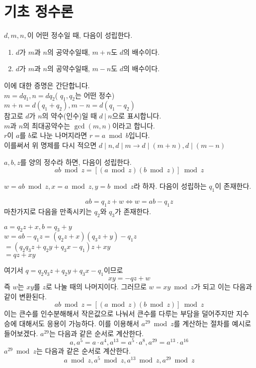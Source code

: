 \section{기초 정수론}

\begin{justbox}
$d,m,n,$이 어떤 정수일 때, 다음이 성립한다.
\begin{enumerate}
    \item $d$가 $m$과 $n$의 공약수일때, $m+n$도 $d$의 배수이다.
    \item $d$가 $m$과 $n$의 공약수일때, $m-n$도 $d$의 배수이다.     
\end{enumerate}
\end{justbox}
이에 대한 증명은 간단합니다. \\
$m=dq_1 , n = dq_2$( $q_1,q_2$는 어떤 정수)\\
$m+n = d(q_1 + q_2) , m-n=d(q_1-q_2)$ \\
참고로 $d$가 $n$의 약수(인수)일 때 $d\: |\: n$으로 표시합니다.\\
$m$과 $n$의 최대공약수는 $\gcd(m,n)$이라고 합니다.\\
$r$이 $a$를 $b$로 나눈 나머지라면  $r=a\bmod b$입니다. \\
이를써서 위 명제를 다시 적으면 $d\mid n , d\mid m  \longrightarrow d \mid (m+n), d\mid (m-n)$



\begin{justbox}
$a,b,z$를 양의 정수라 하면, 다음이 성립한다.
\[ ab\bmod z= [(a\bmod z)(b \bmod z)]\bmod z \]
\end{justbox}

$w = ab\bmod z, x =a \bmod z, y=b\bmod z$라 하자.
다음이 성립하는 $q_1$이 존재한다.

\[ab=q_1z+w \Longleftrightarrow w=ab-q_1 z \]
마찬가지로 다음을 만족시키는 $q_2$와 $q_3$가 존재한다.
\begin{center}
    $a=q_2 z + x , b=q_3 +y$\\
    $w = ab-q_1 z = (q_2z+x)(q_3z+y)-q_1z$\\ $=(q_2q_3z+q_2y+q_3x-q_1)z+xy$\\
    $=qz+xy$
\end{center}
여기서 $q=q_2q_3z+q_2y+q_3x-q_1$이므로 
    \[xy=-qz+w\]
즉 $w$는 $xy$를 $z$로 나눌 때의 나머지이다. 그러므로 $w=xy \bmod z$가 되고 이는 다음과 같이 변환된다.
     \[ab\bmod z= [(a\bmod z)(b \bmod z)]\bmod z\]
이는 큰수를 인수분해해서 작은값으로 나눠서 큰수를 다루는 부담을 덜어주지만 지수승에 대해서도 응용이 가능하다.
이를 이용해서 $a^{29}\bmod z$를 계산하는 절차를 예시로 들어보겠다. $a^{29}$는 다음과 같은 순서로 계산한다.
   \[ a , a^{5}=a \cdot a^4, a^{13}=a^{5}\cdot a^{8}, a^{29}=a^{13}\cdot a^{16} \]
$a^{29} \bmod z$는 다음과 같은 순서로 계산한다.
    \[a \bmod z , a^{5}\bmod z, a^{13}\bmod z, a^{29}\bmod z\]

